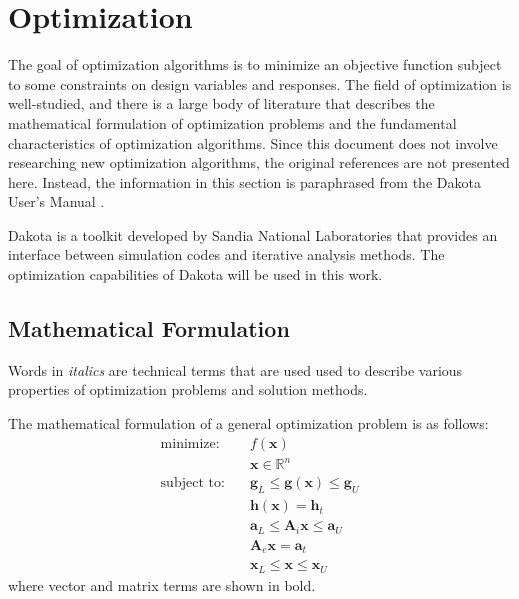 \section{Optimization}
\label{sec:bg:opt}

The goal of optimization algorithms is to minimize an objective function subject to some constraints on design variables and responses.
The field of optimization is well-studied, and there is a large body of literature that describes the mathematical formulation of optimization problems and the fundamental characteristics of optimization algorithms.
Since this document does not involve researching new optimization algorithms, the original references are not presented here.
Instead, the information in this section is paraphrased from the Dakota User's Manual \cite{dakota}.

Dakota is a toolkit developed by Sandia National Laboratories that provides an interface between simulation codes and iterative analysis methods.
The optimization capabilities of Dakota will be used in this work.

\subsection{Mathematical Formulation}
\label{sec:bg:opt:math}

Words in \textit{italics} are technical terms that are used used to describe various properties of optimization problems and solution methods.

The mathematical formulation of a general optimization problem is as follows:
\begin{equation}\begin{split}\label{eq:bg:opt:optimization_problem}
  \mbox{minimize:}  \quad & f\left(\textbf{x}\right) \\
                          & \textbf{x} \in \mathbb{R}^n \\
  \mbox{subject to:}\quad & \textbf{g}_L \leq \textbf{g}\left(\textbf{x}\right) \leq \textbf{g}_U \\
                          & \textbf{h}\left(\textbf{x}\right) = \textbf{h}_t \\
                          & \textbf{a}_L \leq \textbf{A}_i\textbf{x} \leq \textbf{a}_U \\
                          & \textbf{A}_e\textbf{x} = \textbf{a}_t \\
                          & \textbf{x}_L \leq \textbf{x} \leq \textbf{x}_U
\end{split}\end{equation}
where vector and matrix terms are shown in bold.

